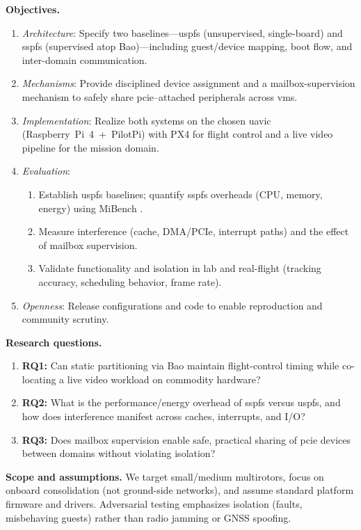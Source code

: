 \noindent\textbf{Objectives.}
\begin{enumerate}[leftmargin=*,itemsep=0.25em]
  \item \textit{Architecture}: Specify two baselines—\gls{uspfs} (unsupervised, single-board) and \gls{sspfs} (supervised atop Bao)—including guest/device mapping, boot flow, and inter-domain communication.
  \item \textit{Mechanisms}: Provide disciplined device assignment and a mailbox-supervision mechanism to safely share \gls{pcie}–attached peripherals across \glspl{vm}.
  \item \textit{Implementation}: Realize both systems on the chosen \gls{uavic} (Raspberry~Pi~4~+~PilotPi) with PX4 for flight control and a live video pipeline for the mission domain.
  \item \textit{Evaluation}: 
    \begin{enumerate}[label*=\alph*),itemsep=0.1em]
      \item Establish \gls{uspfs} baselines; quantify \gls{sspfs} overheads (CPU, memory, energy) using MiBench .
      \item Measure interference (cache, DMA/PCIe, interrupt paths) and the effect of mailbox supervision.
      \item Validate functionality and isolation in lab and real-flight (tracking accuracy, scheduling behavior, frame rate).
    \end{enumerate}
  \item \textit{Openness}: Release configurations and code to enable reproduction and community scrutiny.
\end{enumerate}

\noindent\textbf{Research questions.}
\begin{enumerate}[leftmargin=*,itemsep=0.25em]
  \item \textbf{RQ1:} Can static partitioning via Bao maintain flight-control timing while co-locating a live video workload on commodity hardware?
  \item \textbf{RQ2:} What is the performance/energy overhead of \gls{sspfs} versus \gls{uspfs}, and how does interference manifest across caches, interrupts, and I/O?
  \item \textbf{RQ3:} Does mailbox supervision enable safe, practical sharing of \gls{pcie} devices between domains without violating isolation?
\end{enumerate}

\noindent\textbf{Scope and assumptions.}
We target small/medium multirotors, focus on onboard consolidation (not ground-side networks), and assume standard platform firmware and drivers. Adversarial testing emphasizes isolation (faults, misbehaving guests) rather than radio jamming or GNSS spoofing.


